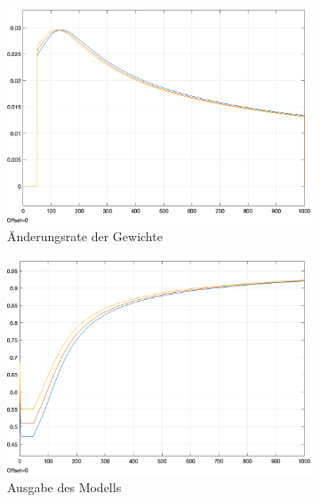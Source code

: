 \begin{figure}[h]
  \caption{Die Parameter des Modells gelangen zu keinem Fixpunkt und verfehlen damit das Minimum der Kostenfunktion}
  \centering
  \begin{subfigure}[b]{0.3\textwidth}
    \includegraphics[width=\textwidth]{abbildungen/c_ep_convergence_weight_update.png}
    \caption{Änderungsrate der Gewichte}
  \end{subfigure}%
  \hfill
  \begin{subfigure}[b]{0.3\textwidth}
    \includegraphics[width=\textwidth]{abbildungen/c_ep_convergence_ausgabe.png}
    \caption{Ausgabe des Modells}
  \end{subfigure}%
  \hfill
  \begin{subfigure}[b]{0.3\textwidth}

\end{subfigure}
\end{figure}
